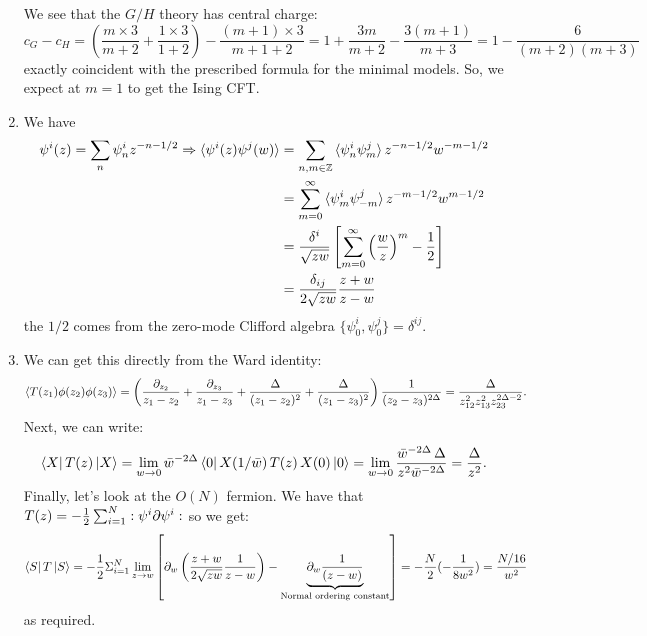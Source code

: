 \documentclass[11pt]{article}
\begin{document}
\begin{enumerate}
	We see that the $G/H$ theory has central charge:
	\[
		c_G - c_H = \left(\frac{m \times 3}{m+2} + \frac{1 \times 3}{1+2} \right) - \frac{(m+1) \times 3}{m+1 + 2} = 1 + \frac{3m}{m+2} - \frac{3(m+1)}{m+3} = 1 - \frac{6}{(m+2)(m+3)}
	\]
	exactly coincident with the prescribed formula for the minimal models. So, we expect at $m=1$ to get the Ising CFT.  
	
	\item We have 
	\[
	\begin{aligned}
				\psi^i (z) = \sum_n \psi_n^i z^{-n-1/2} \Rightarrow \braket{\psi^i(z) \psi^j(w)} &= \sum_{n,m \in \mathbb Z} \braket{\psi_n^i \psi_m^j} z^{-n-1/2} w^{-m-1/2}\\ &= \sum_{m=0}^\infty \braket{\psi_{m}^i  \psi_{-m}^j} z^{-m-1/2} w^{m-1/2}\\ &= \frac{\delta^{i}}{\sqrt{z w}} \left[ \sum_{m=0}^\infty \left(\frac{w}{z}\right)^m - \frac12 \right]\\ &= \frac{\delta_{ij}}{2 \sqrt{z w}} \frac{z+w}{z-w}
	\end{aligned}
	\]
	the $1/2$ comes from the zero-mode Clifford algebra $\{ \psi^i_0 , \psi^j_0\} = \delta^{ij}$.
	\item We can get this directly from the Ward identity:
	\[
		\braket{T(z_1) \phi(z_2) \phi(z_3)}  = \left(\frac{\partial_{z_2}}{z_1 - z_2} + \frac{\partial_{z_3}}{z_1 - z_3} + \frac{\Delta}{(z_1-z_2)^2} + \frac{\Delta}{(z_1-z_3)^2} \right) \frac{1}{(z_2 - z_3)^{2 \Delta}} = \frac{\Delta}{z_{12}^2 z_{13}^2 z_{23}^{2\Delta - 2}}.
	\]
	Next, we can write:
	\[
		\bra{X} T(z) \ket{X} = \lim_{w \to 0} \bar w^{-2\Delta} \bra{0} X(1/\bar w) \, T(z) \, X(0) \ket{0} = \lim_{w\to 0}  \frac{ \bar w^{-2 \Delta}\, \Delta}{z^2 \bar w^{-2 \Delta}} = \frac{\Delta}{z^2}.
	\]
	Finally, let's look at the $O(N)$ fermion. We have that $T(z) = -\frac12 \sum_{i=1}^N :\psi^i \partial \psi^i:$ so we get:
	\[
		\bra{S} T \ket{S} = - \frac12 \Sigma_{i=1}^N \lim_{z \to w} \left[\partial_w\left( \frac{z+w}{2 \sqrt{z w}} \frac{1}{z-w} \right) - \underbrace{\partial_w \frac{1}{(z-w)}}_{\text{Normal ordering constant}} \right] = -\frac{N}{2} (-\frac{1}{8 w^2}) = \frac{N/16}{w^2}
	\]
	as required. 
	

\end{enumerate}
\end{document}
